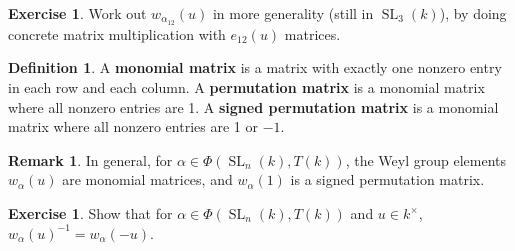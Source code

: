 \documentclass[12pt]{article}
\theoremstyle{definition}
\newtheorem{definition}[theorem]{Definition}
\newtheorem{remark}[theorem]{Remark}
\newtheorem{exercise}[theorem]{Exercise}
\numberwithin{theorem}{subsection}
\newcommand{\tbf}{\textbf}
\newcommand{\inv}{^{-1}}
\DeclareMathOperator{\SL}{SL}
\begin{document}
\begin{exercise}
Work out $w_{\alpha_{12}}(u)$ in more generality (still in $\SL_3(k)$), by doing concrete matrix multiplication with $e_{12}(u)$ matrices.
\end{exercise}

\begin{definition}
A \tbf{monomial matrix} is a matrix with exactly one nonzero entry in each row and each column. A \tbf{permutation matrix} is a monomial matrix where all nonzero entries are 1. A \tbf{signed permutation matrix} is a monomial matrix where all nonzero entries are 1 or $-1$.
\end{definition}

\begin{remark}
In general, for $\alpha \in \Phi(\SL_n(k), T(k))$, the Weyl group elements $w_\alpha(u)$ are monomial matrices, and $w_\alpha(1)$ is a signed permutation matrix.
\end{remark}

\begin{exercise}
Show that for $\alpha \in \Phi(\SL_n(k), T(k))$ and $u \in k^\times$, $w_\alpha(u) \inv = w_\alpha(-u)$.
\end{exercise}
\end{document}
